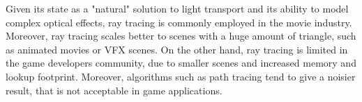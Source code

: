 Given its state as a "natural" solution to light transport and its ability to model complex optical effects, ray tracing is commonly employed in the movie industry. Moreover, ray tracing scales better to scenes with a huge amount of triangle, such as animated movies or VFX scenes. On the other hand, ray tracing is limited in the game developers community, due to smaller scenes and increased memory and lookup footprint. Moreover, algorithms such as path tracing tend to give a noisier result, that is not acceptable in game applications. 


